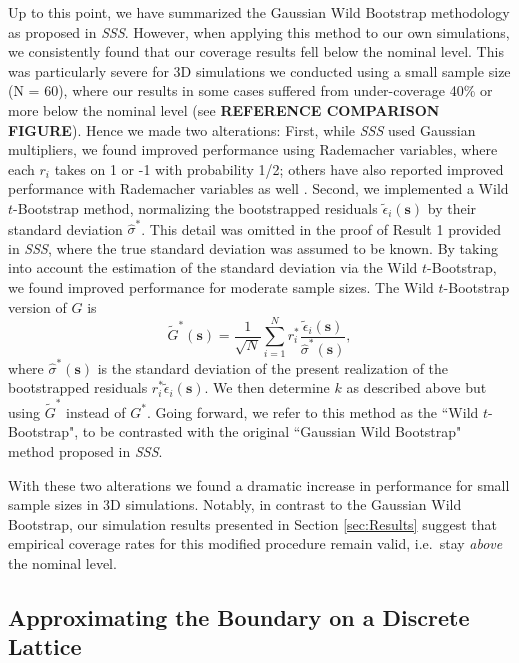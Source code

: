 Up to this point, we have summarized the Gaussian Wild Bootstrap methodology as proposed in \textit{SSS}. However, when applying this method to our own simulations, we consistently found that our coverage results fell below the nominal level.  This was particularly severe for 3D simulations we conducted using a small sample size (N = 60), where our results in some cases suffered from under-coverage 40\% or more below the nominal level (see \textbf{REFERENCE COMPARISON FIGURE}). Hence we made two alterations: First, while \textit{SSS} used Gaussian multipliers, we found improved performance using Rademacher variables, where each $r_i$ takes on 1 or -1 with  probability 1/2; others have also reported improved performance with Rademacher variables as well \citep{Davidson2008-qh}. Second, we implemented a Wild $t$-Bootstrap \citep{Telschow2019-lg} method, normalizing the bootstrapped residuals $\tilde{\epsilon}_{i}(\bm{s})$ by their standard deviation $\hat{\sigma}^*$. This detail was omitted in the proof of Result 1 provided in \textit{SSS}, where the true standard deviation was assumed to be known. By taking into account the estimation of the standard deviation via the Wild $t$-Bootstrap, we found improved performance for moderate sample sizes. The Wild $t$-Bootstrap version of $G$ is
\begin{equation}
\label{eq:wild_bootstrap_G}
\tilde{G}^{*}(\bm{s}) = \frac{1}{\sqrt{N}}\sum_{i=1}^{N} r^*_i\frac{\tilde{\epsilon}_{i}(\bm{s})}{\hat{\sigma}^*(\bm{s})},
\end{equation}
 where $\hat{\sigma}^{*}(\bm{s})$ is the standard deviation of the present realization of the bootstrapped residuals $r^*_i\tilde{\epsilon}_{i}(\bm{s})$. We then determine $k$ as described above but using $\tilde{G}^{*}$ instead of $G^*$. Going forward, we refer to this method as the ``Wild $t$-Bootstrap", to be contrasted with the original ``Gaussian Wild Bootstrap" method proposed in \textit{SSS}.

With these two alterations we found a dramatic increase in performance for small sample sizes in 3D simulations. 
Notably, in contrast to the Gaussian Wild Bootstrap, our simulation results presented in Section \ref{sec:Results} suggest that empirical coverage rates for this modified procedure remain valid, i.e.~stay \textit{above} the nominal level.  

\subsection{Approximating the Boundary on a Discrete Lattice}
\label{sec:boundary_discrete_lattice}

